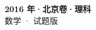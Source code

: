 \documentclass[zihao=-4, a4paper]{ctexart}
\begin{document}
\begin{center}
  {\Large\bfseries 2016 年·北京卷·理科}\\[4pt]
  {\large 数学 · 试题版}
\end{center}
\medskip
{}

\end{document}
